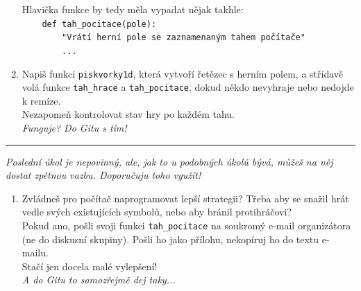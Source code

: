 \documentclass[a4paper,10pt]{article}
\newcommand\startsection[1]{
     \vspace{0.2ex}
    \hrule
    {\fontspec{Oxygen} \tiny
     \vspace{-1ex}
     \emph{#1}
     \vspace{-1.5em}
    }
}
\begin{document}
\begin{enumerate}[resume]
    Hlavička funkce by tedy měla vypadat nějak takhle:
\\\verb+    def tah_pocitace(pole):+
\\\verb+        "Vrátí herní pole se zaznamenaným tahem počítače"+
\\\verb+        ...+

\item Napiš funkci \texttt{piskvorky1d}, která vytvoří řetězec s herním polem,
    a střídavě volá funkce \texttt{tah\_hrace} a \texttt{tah\_pocitace},
    dokud někdo nevyhraje nebo nedojde k remíze.
    \\Nezapomeň kontrolovat stav hry po každém tahu.
    \\\emph{\small Funguje? Do Gitu s tím!}

\end{enumerate}

\startsection{Poslední úkol je nepovinný, ale, jak to u podobných úkolů bývá, můžeš na něj dostat zpětnou vazbu. Doporučuju toho využít!}

\begin{enumerate}[resume]

\item Zvládneš pro počítač naprogramovat lepší strategii?
    Třeba aby se snažil hrát vedle svých existujících symbolů,
    nebo aby bránil protihráčovi?
    \\Pokud ano, pošli svoji funkci \texttt{tah\_pocitace}
    na soukromý e-mail organizátora (ne do diskusní skupiny).
    Pošli ho jako přílohu, nekopíruj ho do textu e-mailu.
    \\Stačí jen docela malé vylepšení!
    \\\emph{\small A do Gitu to samozřejmě dej taky...}

\end{enumerate}
\end{document}
